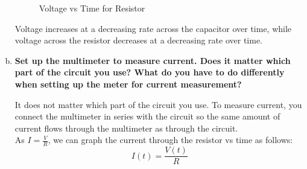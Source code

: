 \documentclass[article, 12pt]{article}
\begin{document}
\begin{enumerate}[a)]
\begin{figure}[H]
            \caption{Voltage vs Time for Resistor}
            \label{fig:resistor}
        \end{figure}
        
        Voltage increases at a decreasing rate across the capacitor over time, while voltage across the resistor decreases at a decreasing rate over time.
        \item \textbf{Set up the multimeter to measure current. Does it matter which part of the circuit you use? What do you have to do differently when setting up the meter for current measurement?}
        
        It does not matter which part of the circuit you use. To measure current, you connect the multimeter in series with the circuit so the same amount of current flows through the multimeter as through the circuit.
        \\[12pt]
        As $I = \frac{V}{R}$, we can graph the current through the resistor vs time as follows:
        \begin{equation}
            I(t) = \frac{V(t)}{R}
        \end{equation}

        \begin{figure}[H]
            \centering
\end{figure}
\end{enumerate}
\end{document}
